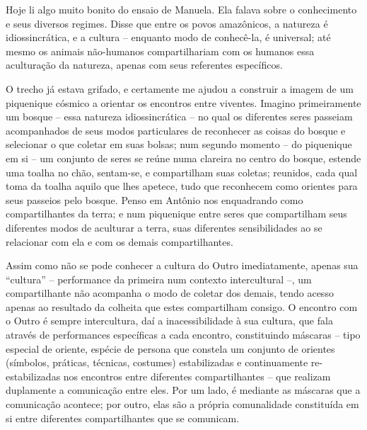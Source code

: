 
Hoje li algo muito bonito do ensaio de Manuela. Ela falava sobre o conhecimento e seus diversos regimes. Disse que entre os povos amazônicos, a natureza é idiossincrática, e a cultura -- enquanto modo de conhecê-la, é universal; até mesmo os animais não-humanos compartilhariam com os humanos essa aculturação da natureza, apenas com seus referentes específicos.

O trecho já estava grifado, e certamente me ajudou a construir a imagem de um piquenique cósmico a orientar os encontros entre viventes. Imagino primeiramente um bosque -- essa natureza idiossincrática -- no qual os diferentes seres passeiam acompanhados de seus modos particulares de reconhecer as coisas do bosque e selecionar o que coletar em suas bolsas; num segundo momento -- do piquenique em si -- um conjunto de seres se reúne numa clareira no centro do bosque, estende uma toalha no chão, sentam-se, e compartilham suas coletas; reunidos, cada qual toma da toalha aquilo que lhes apetece, tudo que reconhecem como orientes para seus passeios pelo bosque. Penso em Antônio nos enquadrando como compartilhantes da terra; e num piquenique entre seres que compartilham seus diferentes modos de aculturar a terra, suas diferentes sensibilidades ao se relacionar com ela e com os demais compartilhantes.

Assim como não se pode conhecer a cultura do Outro imediatamente, apenas sua \enquote{cultura} -- performance da primeira num contexto intercultural --, um compartilhante não acompanha o modo de coletar dos demais, tendo acesso apenas ao resultado da colheita que estes compartilham consigo. O encontro com o Outro é sempre intercultura, daí a inacessibilidade à sua cultura, que fala através de performances específicas a cada encontro, constituindo máscaras -- tipo especial de oriente, espécie de persona que constela um conjunto de orientes (símbolos, práticas, técnicas, costumes) estabilizadas e continuamente re-estabilizadas nos encontros entre diferentes compartilhantes -- que realizam duplamente a comunicação entre eles. Por um lado, é mediante as máscaras que a comunicação acontece; por outro, elas são a própria comunalidade constituída em si entre diferentes compartilhantes que se comunicam.

